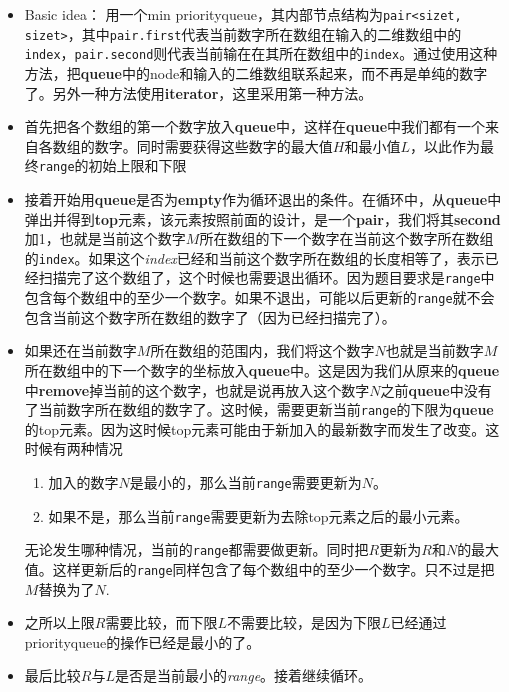 \documentclass[a4paper,12pt]{article}
\begin{document}
\begin{CJK*}{UTF8}{gbsn}
	\begin{itemize}
		\item Basic idea： 用一个min priority\textunderscore queue，其内部节点结构为\texttt{pair\textless size\textunderscore t, size\textunderscore t\textgreater}，其中\texttt{pair.first}代表当前数字所在数组在输入的二维数组中的\texttt{index}，\texttt{pair.second}则代表当前输在在其所在数组中的\texttt{index}。通过使用这种方法，把\textbf{queue}中的node和输入的二维数组联系起来，而不再是单纯的数字了。另外一种方法使用\textbf{iterator}，这里采用第一种方法。
		\item 首先把各个数组的第一个数字放入\textbf{queue}中，这样在\textbf{queue}中我们都有一个来自各数组的数字。同时需要获得这些数字的最大值$H$和最小值$L$，以此作为最终\texttt{range}的初始上限和下限
		\item 接着开始用\textbf{queue}是否为\textbf{empty}作为循环退出的条件。在循环中，从\textbf{queue}中弹出并得到\textbf{top}元素，该元素按照前面的设计，是一个\textbf{pair}，我们将其\textbf{second}加1，也就是当前这个数字$M$所在数组的下一个数字在当前这个数字所在数组的\texttt{index}。如果这个\textit{index}已经和当前这个数字所在数组的长度相等了，表示已经扫描完了这个数组了，这个时候也需要退出循环。因为题目要求是\texttt{range}中包含每个数组中的至少一个数字。如果不退出，可能以后更新的\texttt{range}就不会包含当前这个数字所在数组的数字了（因为已经扫描完了）。
		\item 如果还在当前数字$M$所在数组的范围内，我们将这个数字$N$也就是当前数字$M$所在数组中的下一个数字的坐标放入\textbf{queue}中。这是因为我们从原来的\textbf{queue}中\textbf{remove}掉当前的这个数字，也就是说再放入这个数字$N$之前\textbf{queue}中没有了当前数字所在数组的数字了。这时候，需要更新当前\texttt{range}的下限为\textbf{queue}的top元素。因为这时候top元素可能由于新加入的最新数字而发生了改变。这时候有两种情况
		\begin{enumerate}
			\item 加入的数字$N$是最小的，那么当前\texttt{range}需要更新为$N$。
			\item 如果不是，那么当前\texttt{range}需要更新为去除top元素之后的最小元素。
		\end{enumerate}
	无论发生哪种情况，当前的\texttt{range}都需要做更新。同时把$R$更新为$R$和$N$的最大值。这样更新后的\texttt{range}同样包含了每个数组中的至少一个数字。只不过是把$M$替换为了$N$.
	\item 之所以上限$R$需要比较，而下限$L$不需要比较，是因为下限$L$已经通过priority\textunderscore queue的操作已经是最小的了。
	\item 最后比较$R$与$L$是否是当前最小的\textit{range}。接着继续循环。
	\end{itemize}
	\clearpage
\end{CJK*}
\end{document}
